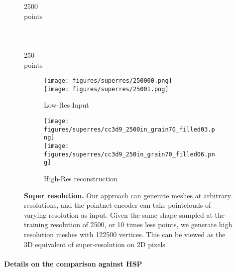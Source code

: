 \documentclass[10pt,twocolumn,letterpaper]{article}
\begin{document}
\begin{figure*}
\centering
\begin{minipage}[c]{0.09\linewidth}
    2500 \\ points \\ \\ \\ \\
    250  \\ points
\end{minipage}
\begin{minipage}[c]{0.42\linewidth}
  \begin{subfigure}[b]{0.99\linewidth}
  \centering
   \texttt{[image: figures/superres/250000.png]}\\
   \texttt{[image: figures/superres/25001.png]}\\
  \caption{Low-Res Input}
  \end{subfigure}
\end{minipage}
\begin{minipage}[c]{0.42\linewidth}
  \begin{subfigure}[b]{0.99\linewidth}
  \centering
   \texttt{[image: figures/superres/cc3d9\_2500in\_grain70\_filled03.png]}\\
   \texttt{[image: figures/superres/cc3d9\_250in\_grain70\_filled06.png]}\\
  \caption{High-Res reconstruction}
  \end{subfigure}
\end{minipage}

\caption{
\textbf{Super resolution.} Our approach can generate meshes at arbitrary resolutions, and the pointnet encoder \cite{qi2016pointnet} can take pointclouds of varying resolution as input. Given the same shape sampled at the training resolution of 2500, or 10 times less points, we generate high resolution meshes with 122500 vertices. This can be viewed as the 3D equivalent of super-resolution on 2D pixels.}
\label{fig:super_resolution}
\end{figure*}






\paragraph{Details on the comparison against HSP \cite{Hane:2017}} 
\end{document}

